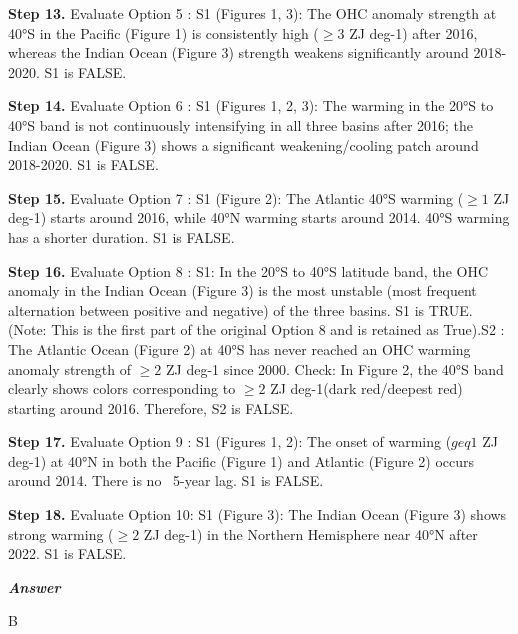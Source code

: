 \begin{tcolorbox}[
    breakable,
    title=Example of Experimental Reasoning in Earth,
    colback=LighterGray,
    colframe=DeepPurple,
    colbacktitle=DeepPurple,
    coltitle=White,
]
\textbf{\textcolor{CaseOrange}{Step 13.}} Evaluate Option 5 : S1 (Figures 1, 3): The OHC anomaly strength at 40°S in the Pacific (Figure 1) is consistently high ($\geq 3$ ZJ deg-1) after 2016, whereas the Indian Ocean (Figure 3) strength weakens significantly around 2018-2020. S1 is FALSE.

\textbf{\textcolor{CaseOrange}{Step 14.}} Evaluate Option 6 : S1 (Figures 1, 2, 3): The warming in the 20°S to 40°S band is not continuously intensifying in all three basins after 2016; the Indian Ocean (Figure 3) shows a significant weakening/cooling patch around 2018-2020. S1 is FALSE.

\textbf{\textcolor{CaseOrange}{Step 15.}} Evaluate Option 7 : S1 (Figure 2): The Atlantic 40°S warming ($\geq 1$ ZJ deg-1) starts around 2016, while 40°N warming starts around 2014. 40°S warming has a shorter duration. S1 is FALSE.

\textbf{\textcolor{CaseOrange}{Step 16.}} Evaluate Option 8 : S1: In the 20°S to 40°S latitude band, the OHC anomaly in the Indian Ocean (Figure 3) is the most unstable (most frequent alternation between positive and negative) of the three basins. S1 is TRUE. (Note: This is the first part of the original Option 8 and is retained as True).S2 : The Atlantic Ocean (Figure 2) at 40°S has never reached an OHC warming anomaly strength of $\geq 2$ ZJ deg-1 since 2000. Check: In Figure 2, the 40°S band clearly shows colors corresponding to $\geq 2$ ZJ deg-1(dark red/deepest red) starting around 2016. Therefore, S2 is FALSE.

\textbf{\textcolor{CaseOrange}{Step 17.}} Evaluate Option 9 : S1 (Figures 1, 2): The onset of warming ($geq 1$ ZJ deg-1) at 40°N in both the Pacific (Figure 1) and Atlantic (Figure 2) occurs around 2014. There is no ~5-year lag. S1 is FALSE.

\textbf{\textcolor{CaseOrange}{Step 18.}} Evaluate Option 10: S1 (Figure 3): The Indian Ocean (Figure 3) shows strong warming ($\geq 2$ ZJ deg-1) in the Northern Hemisphere near 40°N after 2022. S1 is FALSE.

\textbf{\emph{\textcolor{DeepPurple}{Answer}}}

B

\end{tcolorbox}





